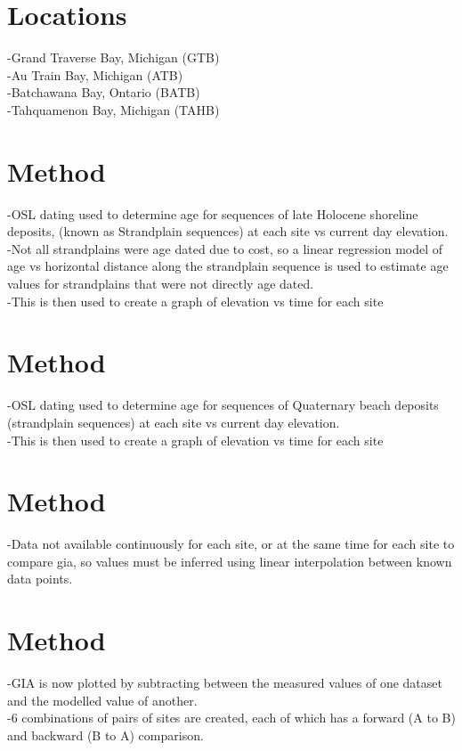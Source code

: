 \documentclass{article}
\begin{document}

\section{Locations}   
-Grand Traverse Bay, Michigan (GTB)\\
-Au Train Bay, Michigan (ATB)\\
-Batchawana Bay, Ontario (BATB)\\
-Tahquamenon Bay, Michigan (TAHB)\\
\newpage
\section{Method}
-OSL dating used to determine age for sequences of late Holocene shoreline
deposits, (known as Strandplain sequences) at each site vs current day elevation.\\
-Not all strandplains were age dated due to cost, so a linear regression model of age vs horizontal distance along the strandplain sequence is used to estimate age values for strandplains that were not directly age dated.\\
-This is then used to create a graph of elevation vs time for each site\\
\newpage
\section[2]{Method}
-OSL dating used to determine age for sequences of Quaternary beach deposits (strandplain sequences) at each site vs current day elevation.\\
-This is then used to create a graph of elevation vs time for each site\\

\newpage
\section[2]{Method}
-Data not available continuously for each site, or at the same time for each site to compare gia, so values must be inferred using linear interpolation between known data points.\\

\newpage
\section[2]{Method}
-GIA is now plotted by subtracting between the measured values of one dataset and the modelled value of another.\\
-6 combinations of pairs of sites are created, each of which has a forward (A to B) and backward (B to A) comparison.\\


\end{document}
